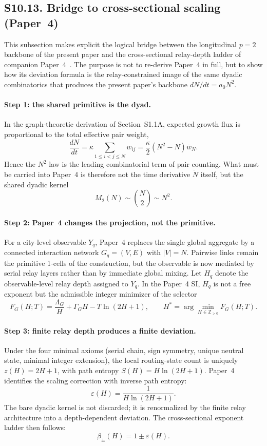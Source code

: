 \documentclass[11pt]{article}
\begin{document}

\subsection*{S10.13. Bridge to cross-sectional scaling (Paper~4)}
\label{sec:S10_13_bridge_cross_sectional}

This subsection makes explicit the logical bridge between the longitudinal
$p=2$ backbone of the present paper and the cross-sectional relay-depth
ladder of companion Paper~4~\cite{Kato2026d}.  The purpose is not to re-derive
Paper~4 in full, but to show how its deviation formula is the relay-constrained
image of the same dyadic combinatorics that produces the present paper's
backbone $dN/dt=a_0N^2$.

\paragraph{Step 1: the shared primitive is the dyad.}
In the graph-theoretic derivation of Section~S1.1A, expected growth flux is
proportional to the total effective pair weight,
\[
\frac{dN}{dt}=\kappa\sum_{1\le i<j\le N} w_{ij}
  =\frac{\kappa}{2}(N^2-N)\bar w_N.
\]
Hence the $N^2$ law is the leading combinatorial term of pair counting.
What must be carried into Paper~4 is therefore not the time derivative
$\dot N$ itself, but the shared dyadic kernel
\[
M_2(N)\sim \binom{N}{2}\sim N^2.
\]

\paragraph{Step 2: Paper~4 changes the projection, not the primitive.}
For a city-level observable $Y_q$, Paper~4 replaces the single global
aggregate by a connected interaction network $G_q=(V,E)$ with $|V|=N$.
Pairwise links remain the primitive 1-cells of the construction, but the
observable is now mediated by serial relay layers rather than by immediate
global mixing.  Let $H_q$ denote the observable-level relay depth assigned
to $Y_q$.  In the Paper~4 SI, $H_q$ is not a free exponent but the
admissible integer minimizer of the selector
\[
F_G(H;T)=\frac{\Lambda_G}{H}+\Gamma_G H-T\ln(2H+1),\qquad
H^\ast=\arg\min_{H\in\mathbb Z_{>0}}F_G(H;T).
\]

\paragraph{Step 3: finite relay depth produces a finite deviation.}
Under the four minimal axioms
(serial chain, sign symmetry, unique neutral state, minimal integer extension),
the local routing-state count is uniquely $z(H)=2H+1$, with path entropy
$S(H)=H\ln(2H+1)$.
Paper~4 identifies the scaling correction with inverse path entropy:
\[
\varepsilon(H)=\frac{1}{H\ln(2H+1)}.
\]
The bare dyadic kernel is not discarded; it is
renormalized by the finite relay architecture into a depth-dependent deviation.
The cross-sectional exponent ladder then follows:
\[
\beta_{\pm}(H)=1\pm\varepsilon(H).
\]
\end{document}
